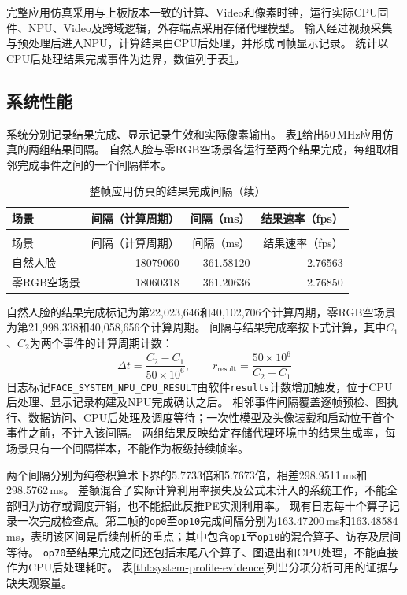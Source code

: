 完整应用仿真采用与上板版本一致的计算、Video和像素时钟，运行实际CPU固件、NPU、Video及跨域逻辑，外存端点采用存储代理模型。
输入经过视频采集与预处理后进入NPU，计算结果由CPU后处理，并形成同帧显示记录。
统计以CPU后处理结果完成事件为边界，数值列于表\ref{tbl:face-result-intervals}。

\subsection{系统性能}

系统分别记录结果完成、显示记录生效和实际像素输出。
表\ref{tbl:face-result-intervals}给出50\,MHz应用仿真的两组结果间隔。
自然人脸与零RGB空场景各运行至两个结果完成，每组取相邻完成事件之间的一个间隔样本。

\begin{reporttable}
\small
\begin{longtable}{@{}lrrr@{}}
\caption{整帧应用仿真的结果完成间隔}\label{tbl:face-result-intervals}\\
\toprule
场景 & 间隔（计算周期） & 间隔（ms） & 结果速率（fps） \\
\midrule
\endfirsthead
\caption[]{整帧应用仿真的结果完成间隔（续）}\\
\toprule
场景 & 间隔（计算周期） & 间隔（ms） & 结果速率（fps） \\
\midrule
\endhead
\bottomrule
\endfoot
自然人脸 & 18079060 & 361.58120 & 2.76563 \\
零RGB空场景 & 18060318 & 361.20636 & 2.76850 \\
\end{longtable}
\end{reporttable}

自然人脸的结果完成标记为第22,023,646和40,102,706个计算周期，零RGB空场景为第21,998,338和40,058,656个计算周期。
间隔与结果完成率按下式计算，其中$C_1$、$C_2$为两个事件的计算周期计数：
\[
\Delta t=\frac{C_2-C_1}{50\times10^6},\qquad
r_{\mathrm{result}}=\frac{50\times10^6}{C_2-C_1}
\]
日志标记\texttt{FACE\_SYSTEM\_NPU\_CPU\_RESULT}由软件\texttt{results}计数增加触发，位于CPU后处理、显示记录构建及NPU完成确认之后。
相邻事件间隔覆盖逐帧预检、图执行、数据访问、CPU后处理及调度等待；一次性模型及头像装载和启动位于首个事件之前，不计入该间隔。
两组结果反映给定存储代理环境中的结果生成率，每场景只有一个间隔样本，不能作为板级持续帧率。

两个间隔分别为纯卷积算术下界的5.7733倍和5.7673倍，相差298.9511\,ms和298.5762\,ms。
差额混合了实际计算利用率损失及公式未计入的系统工作，不能全部归为访存或调度开销，也不能据此反推PE实测利用率。
现有日志每十个算子记录一次完成检查点。第二帧的\texttt{op0}至\texttt{op10}完成间隔分别为163.47200\,ms和163.48584\,ms，表明该区间是后续剖析的重点；其中包含\texttt{op1}至\texttt{op10}的混合算子、访存及层间等待。
\texttt{op70}至结果完成之间还包括末尾八个算子、图退出和CPU处理，不能直接作为CPU后处理耗时。
表\ref{tbl:system-profile-evidence}列出分项分析可用的证据与缺失观察量。

